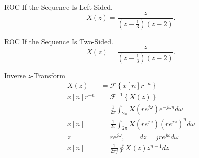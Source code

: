 \begin{frame}{ROC If the Sequence Is Left-Sided.}
    \begin{equation*}
        X(z) = \frac{z}{\left(z - \frac{1}{3}\right)\left(z-2\right)}.
    \end{equation*}
    {
        \begin{center}
            
        \end{center}
    }
\end{frame}

\begin{frame}{ROC If the Sequence Is Two-Sided.}
    \begin{equation*}
        X(z) = \frac{z}{\left(z - \frac{1}{3}\right)\left(z-2\right)}.
    \end{equation*}
    {
        \begin{center}
            
        \end{center}

    }
\end{frame}

\begin{frame}{Inverse $z$-Transform}
    \begin{align*}
        X(z) &= \mathcal{F}\left\{x[n]r^{-n}\right\}\\
        x[n]r^{-n} &= \mathcal{F}^{-1}\left\{X(z)\right\}\\
        &= \frac{1}{2\pi}\int_{2\pi}X(re^{j\omega}) e^{-j\omega n}d\omega\\
        x[n] &= \frac{1}{2\pi}\int_{2\pi}X(re^{j\omega})\left(re^{j\omega}\right)^nd\omega\\
        z &= re^{j\omega}, \qquad dz = jre^{j\omega}d\omega\\
        x[n] &= \frac{1}{2\pi j} \oint X(z)z^{n-1}dz
    \end{align*}
\end{frame}


